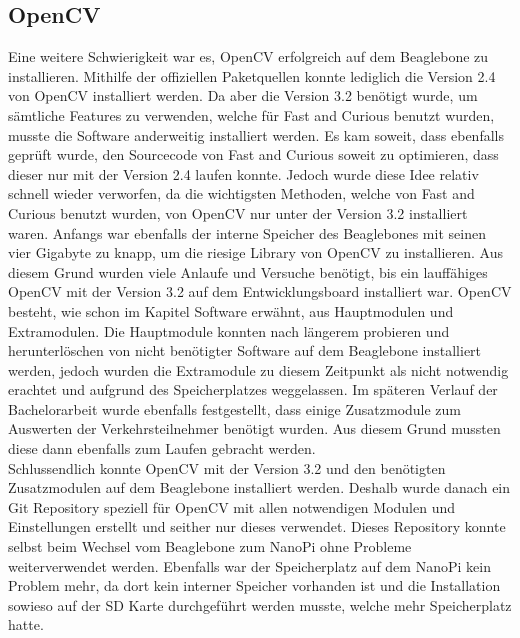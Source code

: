 \subsection{OpenCV}
Eine weitere Schwierigkeit war es, OpenCV erfolgreich auf dem Beaglebone zu installieren. Mithilfe der offiziellen Paketquellen konnte lediglich die Version 2.4 von OpenCV installiert werden. Da aber die Version 3.2 benötigt wurde, um sämtliche Features zu verwenden, welche für Fast and Curious benutzt wurden, musste die Software anderweitig installiert werden. Es kam soweit, dass ebenfalls geprüft wurde, den Sourcecode von Fast and Curious soweit zu optimieren, dass dieser nur mit der Version 2.4 laufen konnte. Jedoch wurde diese Idee relativ schnell wieder verworfen, da die wichtigsten Methoden, welche von Fast and Curious benutzt wurden, von OpenCV nur unter der Version 3.2 installiert waren. Anfangs war ebenfalls der interne Speicher des Beaglebones mit seinen vier Gigabyte zu knapp, um die riesige Library von OpenCV zu installieren. Aus diesem Grund wurden viele Anlaufe und Versuche benötigt, bis ein lauffähiges OpenCV mit der Version 3.2 auf dem Entwicklungsboard installiert war. OpenCV besteht, wie schon im Kapitel Software erwähnt, aus Hauptmodulen und Extramodulen. Die Hauptmodule konnten nach längerem probieren und herunterlöschen von nicht benötigter Software auf dem Beaglebone installiert werden, jedoch wurden die Extramodule zu diesem Zeitpunkt als nicht notwendig erachtet und aufgrund des Speicherplatzes weggelassen. Im späteren Verlauf der Bachelorarbeit wurde ebenfalls festgestellt, dass einige Zusatzmodule zum Auswerten der Verkehrsteilnehmer benötigt wurden. Aus diesem Grund mussten diese dann ebenfalls zum Laufen gebracht werden.\\
Schlussendlich konnte OpenCV mit der Version 3.2 und den benötigten Zusatzmodulen auf dem Beaglebone installiert werden. Deshalb wurde danach ein Git Repository speziell für OpenCV mit allen notwendigen Modulen und Einstellungen erstellt und seither nur dieses verwendet. Dieses Repository konnte selbst beim Wechsel vom Beaglebone zum NanoPi ohne Probleme weiterverwendet werden. Ebenfalls war der Speicherplatz auf dem NanoPi kein Problem mehr, da dort kein interner Speicher vorhanden ist und die Installation sowieso auf der SD Karte durchgeführt werden musste, welche mehr Speicherplatz hatte.